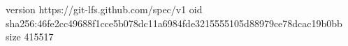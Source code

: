 version https://git-lfs.github.com/spec/v1
oid sha256:46fe2cc49688f1cce5b078dc11a6984fde3215555105d88979ce78dcac19b0bb
size 415517
